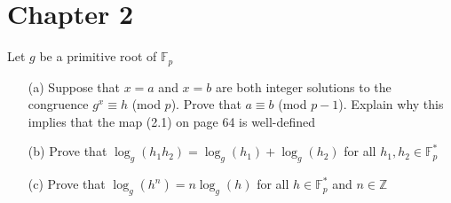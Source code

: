 \chapter*{Chapter 2}
\begin{exer}[2.3]
Let $g$ be a primitive root of $\mathbb{F}_p$

\begin{enumerate}
    \item[(a)] Suppose that $x = a$ and $x = b$ are both integer solutions to the congruence $g^x \equiv h$ (mod $p$). Prove that $a \equiv b$ (mod $p-1$). Explain why this implies that the map (2.1) on page 64 is well-defined
    \item[(b)] Prove that $\log_g(h_1 h_2) = \log_g(h_1) + \log_g(h_2)$ for all $h_1, h_2 \in \mathbb{F}^*_p$
    \item[(c)] Prove that $\log_g(h^n) = n\log_g(h)$ for all $h \in \mathbb{F}^{*}_p$ and $n \in \mathbb{Z}$
\end{enumerate}
\end{exer}

